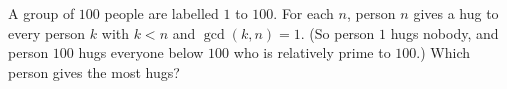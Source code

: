 A group of $100$ people are labelled $1$ to $100$. For each $n$, person $n$ gives a hug to every person $k$ with $k<n$ and $\gcd(k,n)=1$. (So person $1$ hugs nobody, and person $100$ hugs everyone below $100$ who is relatively prime to $100$.) Which person gives the most hugs?
